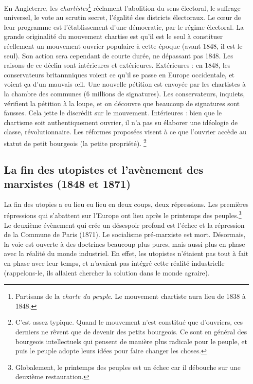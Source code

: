 \documentclass[12pt]{report}
\begin{document}
En Angleterre, les \emph{chartistes}\footnote{Partisans de la \emph{charte du peuple}. Le mouvement chartiste aura lieu de 1838 à 1848.} réclament l'abolition du sens électoral, le suffrage universel, le vote au scrutin secret, l'égalité des districts électoraux. Le cœur de leur programme est l'établissement d'une démocratie, par le régime électoral.
La grande originalité du mouvement chartise est qu'il est le seul à constituer réellement un mouvement ouvrier populaire à cette époque (avant 1848, il est le seul). Son action sera cependant de courte durée, ne dépassant pas 1848. Les raisons de ce déclin sont intérieures et extérieures. Extérieures : en 1848, les conservateurs britannniques voient ce qu'il se passe en Europe occidentale, et voient ça d'un mauvais œil. Une nouvelle pétition est envoyée par les chartistes à la chambre des communes (6 millions de signatures). Les conservateurs, inquiets, vérifient la pétition à la loupe, et on découvre que beaucoup de signatures sont fausses. Cela jette le discrédit sur le mouvement. Intérieures : bien que le chartisme soit authentiquement ouvrier, il n'a pas su élaborer une idéologie de classe, révolutionnaire.
Les réformes proposées visent à ce que l'ouvrier accède au statut de petit bourgeois (la petite propriété).
\footnote{C'est assez typique. Quand le mouvement n'est constitué que d'ouvriers, ces derniers ne rêvent que de devenir des petits bourgeois. Ce sont en général des bourgeois intellectuels qui pensent de manière plus radicale pour le peuple, et puis le peuple adopte leurs idées pour faire changer les choses.}

\subsection{La fin des utopistes et l'avènement des marxistes (1848 et 1871)}


La fin des utopies a eu lieu eu lieu en deux coups, deux répressions. Les premières répressions qui s'abattent sur l'Europe ont lieu après le printemps des peuples.\footnote{Globalement, le printemps des peuples est un échec car il débouche sur une deuxième restauration.} Le deuxième évènement qui crée un désespoir profond est l'échec et la répression de la Commune de Paris (1871). Le socialisme pré-marxiste est mort. Désormais, la voie est ouverte à des doctrines beaucoup plus pures, mais aussi plus en phase avec la réalité du monde industriel. En effet, les utopistes n'étaient pas tout à fait en phase avec leur temps, et n'avaient pas intégré cette réalité industrielle (rappelons-le, ils allaient chercher la solution dans le monde agraire).
\end{document}
